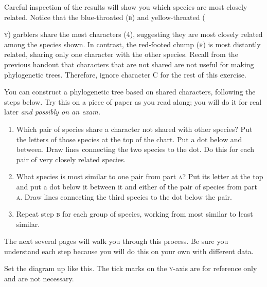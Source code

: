 \documentclass[12pt, addpoints]{exam}
\begin{document}
Careful inspection of the results will show you which species are most closely related. Notice that the blue-throated (\textsc{b}) and yellow-throated ({\textsc{y}) garblers share the most characters (4), suggesting they are most closely related among the species shown. In contrast, the red-footed chump (\textsc{r}) is most distantly related, sharing only one character with the other species. Recall from the previous handout that characters that are not shared are not useful for making phylogenetic trees. Therefore, ignore character C{} for the rest of this exercise.

You can construct a phylogenetic tree  based on shared characters, following the steps
below. Try this on a piece of paper as you read along; you will do it for
real later \emph{and possibly on an exam.} 

\begin{enumerate}%

\item Which pair of species share a character not shared with other species? 
Put the letters of those species at the top of the
chart. Put a dot below and between. Draw lines connecting the two species to the
dot. Do this for each pair of very closely related species.

\item What species is most similar to one pair from part \textsc{a}? Put its letter
at the top and put a dot below it between it and either of the pair of species from part \textsc{a}.
Draw lines connecting the third species to the dot below the pair.

\item Repeat step \textsc{b} for each group of species, working from most similar to
least similar.

\end{enumerate}

The next several pages will walk you through this process. Be sure you understand each step because you will do this on your own with different data.

\newpage

Set the diagram up like this. The tick marks on the \textsc{y}-axis are for reference only and are not necessary.

}
\end{document}
